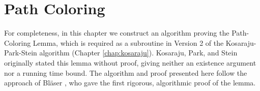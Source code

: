 \chapter{Path Coloring}
\label{chap:path_coloring}

For completeness, in this chapter we construct an algorithm proving the
Path-Coloring Lemma, which is required as a subroutine in Version 2 of the
Kosaraju-Park-Stein algorithm (Chapter \ref{chap:kosaraju}). Kosaraju, Park, and
Stein \cite{Kosaraju1994} originally stated this lemma without proof, giving
neither an existence argument nor a running time bound. The algorithm and proof
presented here follow the approach of Bl\"aser \cite{Blaser2004}, who gave the
first rigorous, algorithmic proof of the lemma.



